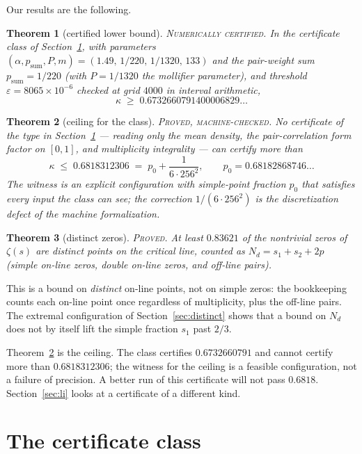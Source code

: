 \documentclass[11pt]{article}
\newtheorem{theorem}{Theorem}
\theoremstyle{remark}
\newcommand{\eps}{\varepsilon}
\newcommand{\Zeta}{\zeta}
\begin{document}
Our results are the following.

\begin{theorem}[certified lower bound]\label{thm:cert}
\textsc{Numerically certified.} In the certificate class of Section~\ref{sec:cert},
with parameters $(\alpha,p_{\mathrm{sum}},P,m)=(1.49,\,1/220,\,1/1320,\,133)$ and
the pair-weight sum $p_{\mathrm{sum}}=1/220$ (with $P=1/1320$ the mollifier
parameter), and threshold $\eps = 8065\times 10^{-6}$ checked at grid $4000$ in
interval arithmetic,
\[
  \kappa \;\ge\; 0.6732660791400006829\ldots
\]
\end{theorem}

\begin{theorem}[ceiling for the class]\label{thm:ceiling}
\textsc{Proved, machine-checked.} No certificate of the type in
Section~\ref{sec:cert} --- reading only the mean density, the pair-correlation form
factor on $[0,1]$, and multiplicity integrality --- can certify more than
\[
  \kappa \;\le\; 0.6818312306 \;=\; p_0 + \frac{1}{6\cdot 256^2},
  \qquad p_0 = 0.68182868746\ldots
\]
The witness is an explicit configuration with simple-point fraction $p_0$ that
satisfies every input the class can see; the correction $1/(6\cdot256^2)$ is the
discretization defect of the machine formalization.
\end{theorem}

\begin{theorem}[distinct zeros]\label{thm:distinct}
\textsc{Proved.} At least $0.83621$ of the nontrivial zeros of $\Zeta(s)$ are distinct
points on the critical line, counted as $N_d = s_1+s_2+2p$ (simple on-line zeros,
double on-line zeros, and off-line pairs).
\end{theorem}

This is a bound on \emph{distinct} on-line points, not on simple zeros: the
bookkeeping counts each on-line point once regardless of multiplicity, plus the
off-line pairs. The extremal configuration of Section~\ref{sec:distinct} shows that
a bound on $N_d$ does not by itself lift the simple fraction $s_1$ past $2/3$.

Theorem~\ref{thm:ceiling} is the ceiling. The class certifies
$0.6732660791$ and cannot certify more than $0.6818312306$; the witness for the
ceiling is a feasible configuration, not a failure of precision. A better run of
this certificate will not pass $0.6818$. Section~\ref{sec:li} looks at a
certificate of a different kind.

\section{The certificate class}
\label{sec:cert}
\end{document}
